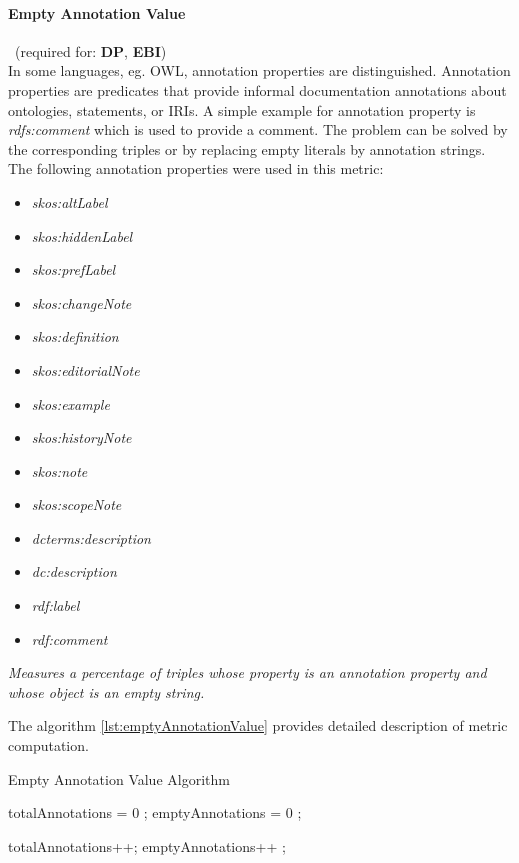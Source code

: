 \paragraph{Empty Annotation Value}~(required for: \textbf{DP}, \textbf{EBI})~\\
In some languages, eg. OWL, annotation properties are distinguished.
Annotation properties are predicates that provide informal documentation annotations about ontologies, statements, or IRIs. 
A simple example for annotation property is \textit{rdfs:comment} which is used to provide a comment. 
The problem can be solved by the corresponding triples or by replacing empty literals by annotation strings.
The following annotation properties were used in this metric:
\begin{itemize}
\item \textit{skos:altLabel}
\item \textit{skos:hiddenLabel}
\item \textit{skos:prefLabel}
\item \textit{skos:changeNote}
\item \textit{skos:definition}
\item \textit{skos:editorialNote}
\item \textit{skos:example}
\item \textit{skos:historyNote}
\item \textit{skos:note}
\item \textit{skos:scopeNote}
\item \textit{dcterms:description}
\item \textit{dc:description}
\item \textit{rdf:label}
\item \textit{rdf:comment}
\end{itemize}

\begin{mdframed}[style=metricdefinition]
\emph{Measures a percentage of triples whose property is an annotation property and whose object is an empty string.}

\end{mdframed}

The algorithm \ref{lst:emptyAnnotationValue} provides detailed description of metric computation. 
\begin{algorithm}
\caption{Empty Annotation Value Algorithm}\label{lst:emptyAnnotationValue}
\begin{algorithmic}[1]
\State totalAnnotations = 0 ;
\State emptyAnnotations = 0 ;
\EndProcedure

 totalAnnotations++; \EndIf
{} emptyAnnotations++ ; \EndIf
{}
\EndProcedure
\end{algorithmic}
\end{algorithm}

